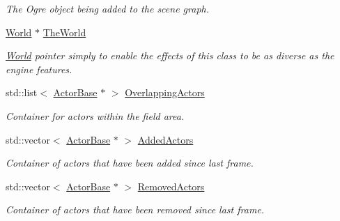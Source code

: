 \begin{DoxyCompactItemize}
\begin{DoxyCompactList}\small\item\em The Ogre object being added to the scene graph. \item\end{DoxyCompactList}\item 
\hypertarget{classphys_1_1AreaEffect_a3008e8e90236141ca4c21a9580e6f5de}{
\hyperlink{classphys_1_1World}{World} $\ast$ \hyperlink{classphys_1_1AreaEffect_a3008e8e90236141ca4c21a9580e6f5de}{TheWorld}}
\label{d4/d55/classphys_1_1AreaEffect_a3008e8e90236141ca4c21a9580e6f5de}

\begin{DoxyCompactList}\small\item\em \hyperlink{classphys_1_1World}{World} pointer simply to enable the effects of this class to be as diverse as the engine features. \item\end{DoxyCompactList}\item 
\hypertarget{classphys_1_1AreaEffect_a45834591f0ea49ba6657ce58d070ee9b}{
std::list$<$ \hyperlink{classphys_1_1ActorBase}{ActorBase} $\ast$ $>$ \hyperlink{classphys_1_1AreaEffect_a45834591f0ea49ba6657ce58d070ee9b}{OverlappingActors}}
\label{d4/d55/classphys_1_1AreaEffect_a45834591f0ea49ba6657ce58d070ee9b}

\begin{DoxyCompactList}\small\item\em Container for actors within the field area. \item\end{DoxyCompactList}\item 
\hypertarget{classphys_1_1AreaEffect_a5bd2ad15db98ecc140a8bf2fee8d0c1f}{
std::vector$<$ \hyperlink{classphys_1_1ActorBase}{ActorBase} $\ast$ $>$ \hyperlink{classphys_1_1AreaEffect_a5bd2ad15db98ecc140a8bf2fee8d0c1f}{AddedActors}}
\label{d4/d55/classphys_1_1AreaEffect_a5bd2ad15db98ecc140a8bf2fee8d0c1f}

\begin{DoxyCompactList}\small\item\em Container of actors that have been added since last frame. \item\end{DoxyCompactList}\item 
\hypertarget{classphys_1_1AreaEffect_a1b1b6cced61ead4d6de3d8bad5c2125a}{
std::vector$<$ \hyperlink{classphys_1_1ActorBase}{ActorBase} $\ast$ $>$ \hyperlink{classphys_1_1AreaEffect_a1b1b6cced61ead4d6de3d8bad5c2125a}{RemovedActors}}
\label{d4/d55/classphys_1_1AreaEffect_a1b1b6cced61ead4d6de3d8bad5c2125a}

\begin{DoxyCompactList}\small\item\em Container of actors that have been removed since last frame. \item\end{DoxyCompactList}\end{DoxyCompactItemize}
